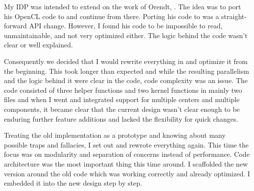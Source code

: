 My IDP was intended to extend on the work of Orendt, \cite{orend10numerische}. The idea was to port his OpenCL code to \cuda{} and continue from there.
Porting his code to \cuda{} was a straight-forward API change. However, I found his code to be impossible to read, unmaintainable, and not very optimized either. The logic behind the code wasn't clear or well explained.

Consequently we decided that I would rewrite everything in \cuda{} and optimize it from the beginning. This took longer than expected and while the resulting parallelism and the logic behind it were clear in the code, code complexity was an issue. The code consisted of three helper functions and two kernel functions in mainly two files and when I went and integrated support for multiple centers and multiple components, it became clear that the current design wasn't clear enough to be enduring further feature additions and lacked the flexibility for quick changes.

Treating the old implementation as a prototype and knowing about many possible traps and fallacies, I set out and rewrote everything again. This time the focus was on modularity and separation of concerns instead of performance. Code architecture was the most important thing this time around. I scaffolded the new version around the old code which was working correctly and already optimized. I embedded it into the new design step by step.